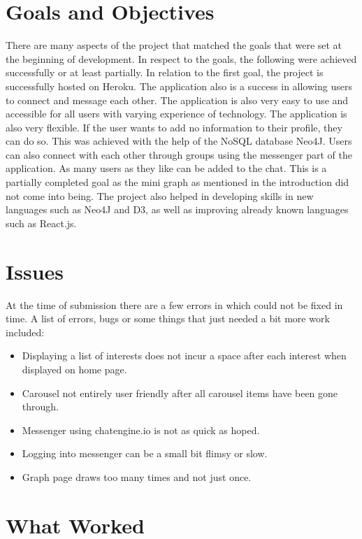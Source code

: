 \section{Goals and Objectives}

There are many aspects of the project that matched the goals that were set at the beginning of development. In respect to the goals, the following were achieved successfully or at least partially. In relation to the first goal, the project is successfully hosted on Heroku. The application also is a success in allowing users to connect and message each other. The application is also very easy to use and accessible for all users with varying experience of technology. The application is also very flexible. If the user wants to add no information to their profile, they can do so. This was achieved with the help of the NoSQL database Neo4J. Users can also connect with each other through groups using the messenger part of the application. As many users as they like can be added to the chat. This is a partially completed goal as the mini graph as mentioned in the introduction did not come into being. The project also helped in developing skills in new languages such as Neo4J and D3, as well as improving already known languages such as React.js.\\

\section{Issues}
At the time of submission there are a few errors in which could not be fixed in time. A list of errors, bugs or some things that just needed a bit more work included: 
\begin{itemize}
\item Displaying a list of interests does not incur a space after each interest when displayed on home page. 
\item Carousel not entirely user friendly after all carousel items have been gone through. 
\item Messenger using chatengine.io is not as quick as hoped.
\item Logging into messenger can be a small bit flimsy or slow. 
\item Graph page draws too many times and not just once. 
\end{itemize}

\section{What Worked}

